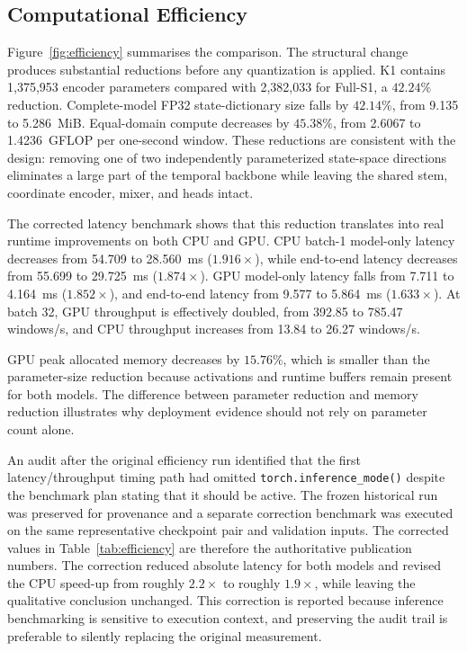 \subsection{Computational Efficiency}
\label{subsec:efficiency_results}




Figure~\ref{fig:efficiency} summarises the comparison. The structural change produces substantial reductions before any quantization is applied. K1 contains 1,375,953 encoder parameters compared with 2,382,033 for Full-S1, a $42.24\%$ reduction. Complete-model FP32 state-dictionary size falls by $42.14\%$, from 9.135 to 5.286~MiB. Equal-domain compute decreases by $45.38\%$, from 2.6067 to 1.4236~GFLOP per one-second window. These reductions are consistent with the design: removing one of two independently parameterized state-space directions eliminates a large part of the temporal backbone while leaving the shared stem, coordinate encoder, mixer, and heads intact.

The corrected latency benchmark shows that this reduction translates into real runtime improvements on both CPU and GPU. CPU batch-1 model-only latency decreases from 54.709 to 28.560~ms ($1.916\times$), while end-to-end latency decreases from 55.699 to 29.725~ms ($1.874\times$). GPU model-only latency falls from 7.711 to 4.164~ms ($1.852\times$), and end-to-end latency from 9.577 to 5.864~ms ($1.633\times$). At batch 32, GPU throughput is effectively doubled, from 392.85 to 785.47 windows/s, and CPU throughput increases from 13.84 to 26.27 windows/s.

GPU peak allocated memory decreases by $15.76\%$, which is smaller than the parameter-size reduction because activations and runtime buffers remain present for both models. The difference between parameter reduction and memory reduction illustrates why deployment evidence should not rely on parameter count alone.

An audit after the original efficiency run identified that the first latency/throughput timing path had omitted \texttt{torch.inference\_mode()} despite the benchmark plan stating that it should be active. The frozen historical run was preserved for provenance and a separate correction benchmark was executed on the same representative checkpoint pair and validation inputs. The corrected values in Table~\ref{tab:efficiency} are therefore the authoritative publication numbers. The correction reduced absolute latency for both models and revised the CPU speed-up from roughly $2.2\times$ to roughly $1.9\times$, while leaving the qualitative conclusion unchanged. This correction is reported because inference benchmarking is sensitive to execution context, and preserving the audit trail is preferable to silently replacing the original measurement.

